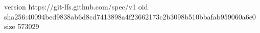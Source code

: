 version https://git-lfs.github.com/spec/v1
oid sha256:40094bed9838ab6d8cd7413898a4f23662173c2b3098b510bbafab959060a6e0
size 573029
